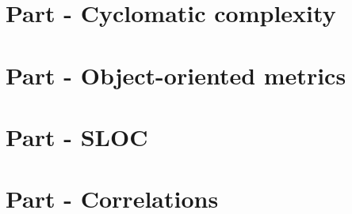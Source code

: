 \documentclass[12pt]{article}
\begin{document}
\section{Part - Cyclomatic complexity}

\section{Part - Object-oriented metrics}

\section{Part - SLOC}

\section{{Part - Correlations}}

{}

\end{document}
